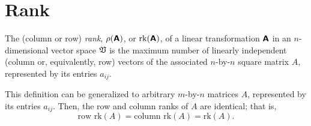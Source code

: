 \section{Rank}
\label{2014-m-fdvs-rank}

The (column or row) {\em rank}, $\rho (  \textsf{\textbf{A}}  )$,
or $\textrm{rk} ( \textsf{\textbf{A}} )$,
of a linear transformation $ \textsf{\textbf{A}} $
in an $n$-dimensional vector space ${\frak V}$
is the maximum number of linearly independent (column or, equivalently,
row) vectors of the associated
$n$-by-$n$ square matrix $ A $, represented by its entries  $a_{ij}$.

This definition can be generalized to arbitrary
$m$-by-$n$ matrices $A$, represented by its entries  $a_{ij}$.
Then, the row and column ranks of $A$ are identical; that is,
\begin{equation}
\textrm{row rk} (A) =
\textrm{column rk} (A)  =
\textrm{rk} (A).
\end{equation}


